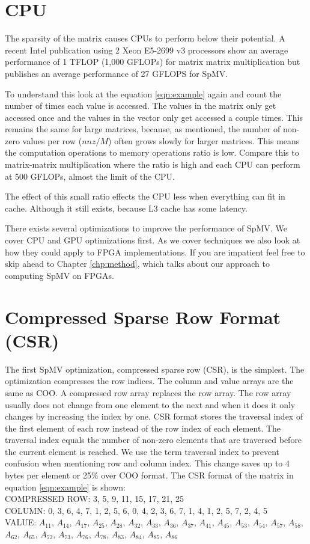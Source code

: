 \section{CPU}
\par The sparsity of the matrix causes CPUs to perform below their potential. A recent Intel publication using 2 Xeon E5-2699 v3 processors show an average performance of 1 TFLOP (1,000 GFLOPs) for matrix matrix multiplication but publishes an average performance of 27 GFLOPS for SpMV.
\par To understand this look at the equation \ref{eqn:example} again and count the number of times each value is accessed. The values in the matrix only get accessed once and the values in the vector only get accessed a couple times. This remains the same for large matrices, because, as mentioned, the number of non-zero values per row ($nnz/M$) often grows slowly for larger matrices. This means the computation operations to memory operations ratio is low. Compare this to matrix-matrix multiplication where the ratio is high and each CPU can perform at 500 GFLOPs, almost the limit of the CPU.
\par The effect of this small ratio effects the CPU less when everything can fit in cache. Although it still exists, because L3 cache has some latency.
\par There exists several optimizations to improve the performance of SpMV. We cover CPU and GPU optimizations first. As we cover techniques we also look at how they could apply to FPGA implementations. If you are impatient feel free to skip ahead to Chapter \ref{chp:method}, which talks about our approach to computing SpMV on FPGAs.

\section{Compressed Sparse Row Format (CSR)}
The first SpMV optimization, compressed sparse row (CSR), is the simplest. The optimization compresses the row indices. The column and value arrays are the same as COO. A compressed row array replaces the row array. The row array usually does not change from one element to the next and when it does it only changes by increasing the index by one. CSR format stores the traversal index of the first element of each row instead of the row index of each element. The traversal index equals the number of non-zero elements that are traversed before the current element is reached. We use the term traversal index to prevent confusion when mentioning row and column index. This change saves up to 4 bytes per element or 25\% over COO format. The CSR format of the matrix in equation \ref{eqn:example} is shown: \\
COMPRESSED ROW: 3, 5, 9, 11, 15, 17, 21, 25 \\
COLUMN: 0, 3, 6, 4, 7, 1, 2, 5, 6, 0, 4, 2, 3, 6, 7, 1, 4, 1, 2, 5, 7, 2, 4, 5\\ 
VALUE: $A_{11}$, $A_{14}$, $A_{17}$, $A_{25}$, $A_{28}$, $A_{32}$, $A_{33}$, $A_{36}$, $A_{37}$, $A_{41}$, $A_{45}$, $A_{53}$, $A_{54}$, $A_{57}$, $A_{58}$, $A_{62}$, $A_{65}$, $A_{72}$, $A_{73}$, $A_{76}$, $A_{78}$, $A_{83}$, $A_{84}$, $A_{85}$, $A_{86}$ \par
